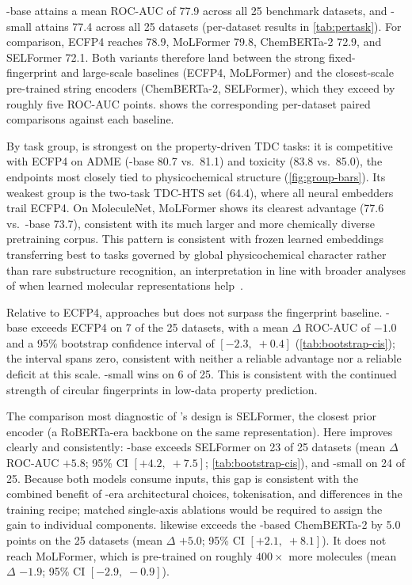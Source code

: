 \documentclass[11pt,a4paper]{article}
\begin{document}
\model{}-base attains a mean ROC-AUC of 77.9 across all 25 benchmark
datasets, and \model{}-small attains 77.4 across all 25 datasets
(per-dataset results in \cref{tab:pertask}). For comparison, ECFP4 reaches 78.9, MoLFormer
79.8, ChemBERTa-2 72.9, and SELFormer 72.1. Both \model{} variants therefore
land between the strong fixed-fingerprint and large-scale \smiles{} baselines
(ECFP4, MoLFormer) and the closest-scale pre-trained string encoders
(ChemBERTa-2, SELFormer), which they exceed by roughly five ROC-AUC
points.  shows the corresponding per-dataset paired
comparisons against each baseline.

By task group, \model{} is strongest on the property-driven TDC tasks: it is
competitive with ECFP4 on ADME (\model{}-base 80.7 vs.\ 81.1) and toxicity
(83.8 vs.\ 85.0), the endpoints most closely tied to physicochemical structure
(\cref{fig:group-bars}). Its weakest group is the two-task TDC-HTS set (64.4),
where all neural embedders trail ECFP4. On MoleculeNet, MoLFormer shows its
clearest advantage (77.6 vs.\ \model{}-base 73.7), consistent with its much
larger and more chemically diverse pretraining corpus. This pattern is
consistent with frozen learned embeddings transferring best to tasks governed by
global physicochemical character rather than rare substructure recognition, an
interpretation in line with broader analyses of when learned molecular
representations help~\citep{yangAnalyzingLearnedMolecular2019,dengSystematicStudyKey2023}.

Relative to ECFP4, \model{} approaches but does not surpass the fingerprint
baseline. \model{}-base exceeds ECFP4 on 7 of the 25 datasets,
with a mean $\Delta$ ROC-AUC of $-1.0$ and a 95\% bootstrap confidence
interval of $[-2.3,\;+0.4]$ (\cref{tab:bootstrap-cis}); the interval
spans zero, consistent with neither a reliable advantage nor a reliable
deficit at this scale. \model{}-small wins on 6 of 25. This is consistent with the continued strength
of circular fingerprints in low-data property prediction.

The comparison most diagnostic of \model{}'s design is SELFormer, the closest
prior \selfies{} encoder (a RoBERTa-era backbone on the same representation).
Here \model{} improves clearly and consistently: \model{}-base exceeds
SELFormer on 23 of 25 datasets (mean $\Delta$ ROC-AUC
$+5.8$; 95\% CI $[+4.2,\;+7.5]$; \cref{tab:bootstrap-cis}), and
\model{}-small on 24 of 25. Because both models consume \selfies{} inputs, this
gap is consistent with the combined benefit of \modernbert{}-era architectural
choices, \ape{} tokenisation, and differences in the training recipe; matched
single-axis ablations would be required to assign the gain to individual
components. \model{} likewise exceeds the \smiles{}-based ChemBERTa-2 by 5.0
points on the 25 datasets (mean $\Delta$ $+5.0$; 95\% CI
$[+2.1,\;+8.1]$). It does not reach MoLFormer, which is pre-trained on roughly
$400\times$ more molecules (mean $\Delta$ $-1.9$; 95\% CI $[-2.9,\;-0.9]$).
\end{document}
